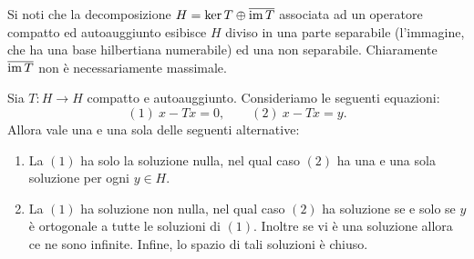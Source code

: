 \begin{remark}
	Si noti che la decomposizione $H = \ker T \oplus \overline{\operatorname{im} T}$ associata ad un operatore compatto ed autoauggiunto esibisce $H$ diviso in una parte separabile (l'immagine, che ha una base hilbertiana numerabile) ed una non separabile. Chiaramente $\overline{\operatorname{im} T}$ non è necessariamente massimale.
\end{remark}

\begin{theorem}
	Sia $T:H \to H$ compatto e autoauggiunto. Consideriamo le seguenti equazioni:
	\begin{equation*}
		(1)\ x - Tx = 0, \qquad (2)\ x-Tx = y.
	\end{equation*}
	Allora vale una e una sola delle seguenti alternative:
	\begin{enumerate}
		\item La $(1)$ ha solo la soluzione nulla, nel qual caso $(2)$ ha una e una sola soluzione per ogni $y \in H$.
		\item La $(1)$ ha soluzione non nulla, nel qual caso $(2)$ ha soluzione se e solo se $y$ è ortogonale a tutte le soluzioni di $(1)$.
		Inoltre se vi è una soluzione allora ce ne sono infinite.
		Infine, lo spazio di tali soluzioni è chiuso.
	\end{enumerate}
\end{theorem}
